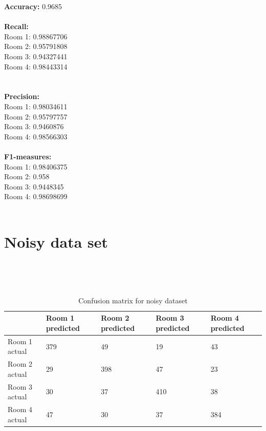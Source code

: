 \documentclass{article}
\begin{document}
\textbf{Accuracy:} 0.9685 \\
\\
\textbf{Recall:} \\
Room 1: 0.98867706 \\
Room 2: 0.95791808 \\
Room 3: 0.94327441 \\
Room 4: 0.98443314 \\
\\
\\
\textbf{Precision:} \\
Room 1: 0.98034611 \\
Room 2: 0.95797757 \\
Room 3: 0.9460876 \\
Room 4: 0.98566303 \\
\\
\textbf{F1-measures:} \\
Room 1: 0.98406375 \\
Room 2: 0.958  \\
Room 3: 0.9448345 \\
Room 4: 0.98698699 \\
\\

\section{Noisy data set}
  \\

\renewcommand{\arraystretch}{2}  
\begin{table}[htb]
  \centering
  \caption{Confusion matrix for noisy dataset} \\
  \begin{tabular}{|l|l|l|l|l|}
  \hline
                & Room 1 predicted & Room 2 predicted & Room 3 predicted & Room 4 predicted \\ \hline
  Room 1 actual & 379              & 49               & 19               & 43               \\ \hline
  Room 2 actual & 29               & 398              & 47               & 23               \\ \hline
  Room 3 actual & 30               & 37               & 410              & 38               \\ \hline
  Room 4 actual & 47               & 30               & 37               & 384              \\ \hline
  \end{tabular}
\end{table}
\\
\end{document}
